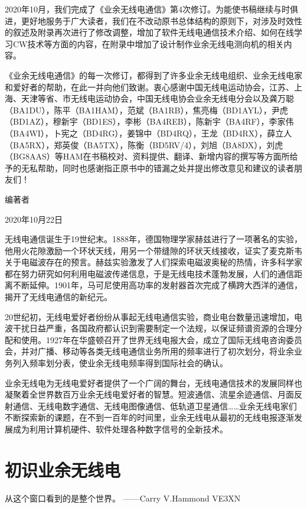 \documentclass[12pt,UTF8]{ctexbook}
\begin{document}
2020年10月，我们完成了《业余无线电通信》第4次修订。为能使书稿继续与时俱进，更好地服务于广大读者，我们在不改动原书总体结构的原则下，对涉及时效性的叙述及附录再次进行了修改调整，增加了软件无线电通信技术介绍、如何在线学习CW技术等方面的内容，在附录中增加了设计制作业余无线电测向机的相关内容。

《业余无线电通信》的每一次修订，都得到了许多业余无线电组织、业余无线电家和爱好者的帮助，在此一并向他们致谢。衷心感谢中国无线电运动协会，江苏、上海、天津等省、市无线电运动协会，中国无线电协会业余无线电分会以及龚万聪（BA1DU），陈平（BA1HAM），范斌（BA1RB），焦亮梅（BD1AYL），尹虎（BD1AZ），穆新宇（BD1ES），李彬（BA4REB），陈新宇（BA4RF），李家伟（BA4WI），卜宪之（BD4RG），姜锦中（BD4RQ），王龙（BD4RX），薛立人（BA5RX），郑英俊（BA5TX），陈衡（BD5RV/4），刘旭（BA8DX），刘虎（BG8AAS）等HAM在书稿校对、资料提供、翻译、新增内容的撰写等方面所给予的无私帮助，同时也感谢指正原书中的错漏之处并提出修改意见和建议的读者朋友们！

编著者

2020年10月22日

\mainmatter

无线电通信诞生于19世纪末。1888年，德国物理学家赫兹进行了一项著名的实验，他用火花隙激励一个环状天线，用另一个带缝隙的环状天线接收，证实了麦克斯韦关于电磁波存在的预言。赫兹实验激发了人们探索电磁波奥秘的热情，许多科学家都在努力研究如何利用电磁波传递信息，于是无线电技术蓬勃发展，人们的通信距离不断延伸。1901年，马可尼使用高功率的发射器首次完成了横跨大西洋的通信，揭开了无线电通信的新纪元。

20世纪初，无线电爱好者纷纷从事起无线电通信实验，商业电台数量迅速增加，电波干扰日益严重，各国政府都认识到需要制定一个法规，以保证频谱资源的合理分配和使用。1927年在华盛顿召开了世界无线电报大会，成立了国际无线电咨询委员会，并对广播、移动等各类无线电通信业务所用的频率进行了初次划分，将业余业务列入频率划分表，使业余无线电频率得到国际社会的确认。

业余无线电为无线电爱好者提供了一个广阔的舞台，无线电通信技术的发展同样也凝聚着全世界数百万业余无线电爱好者的智慧。短波通信、流星余迹通信、月面反射通信、无线电数字通信、无线电图像通信、低轨道卫星通信……业余无线电家们不断探索新的课题，在不到一百年的时间里，业余无线电从最初的无线电报逐渐发展成为利用计算机硬件、软件处理各种数字信号的全新技术。

\chapter{初识业余无线电}

从这个窗口看到的是整个世界。
——Carry V.Hammond VE3XN
\end{document}
